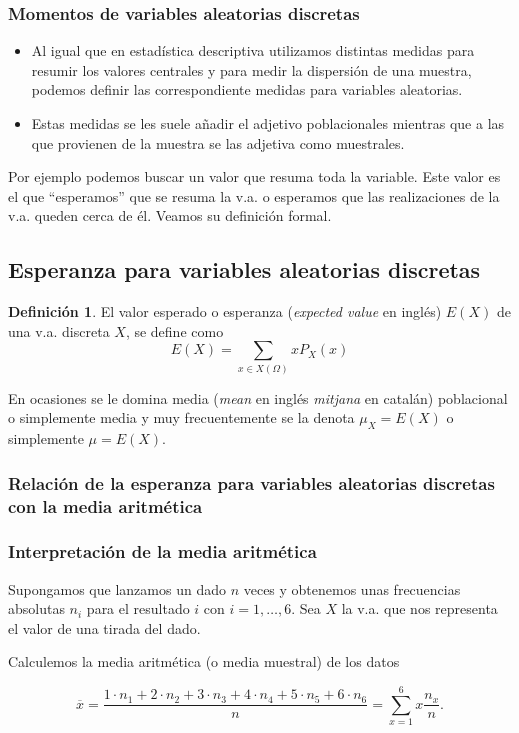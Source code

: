 \documentclass[handout]{beamer}\usepackage[]{graphicx}\usepackage[]{color}
\renewcommand{\emph}[1]{{\color{red}#1}}
\theoremstyle{plain}
\theoremstyle{definition}
\newtheorem{definicion}{Definición}
\begin{document}
\begin{frame}
\frametitle{Momentos de variables aleatorias discretas}

\begin{itemize}
\item Al igual que en  estadística descriptiva  utilizamos distintas medidas para
resumir los valores centrales y para medir la dispersión de una muestra, podemos definir
las correspondiente medidas para variables aleatorias.

\item Estas medidas se les suele añadir
el adjetivo poblacionales mientras que a las que provienen de la muestra se las adjetiva
como muestrales.
\end{itemize}

Por ejemplo  podemos buscar un valor que resuma toda la variable.
Este valor es el que ``\emph{esperamos}'' que se resuma la v.a. o esperamos que las
realizaciones de la v.a. queden cerca de él. Veamos su definición formal.

\end{frame}

\subsection{Esperanza para variables aleatorias discretas}

\begin{frame}


\begin{definicion}
    El valor \emph{esperado o esperanza} (\textsl{expected value} en inglés) $E(X)$ de una v.a. discreta $X$, se define como
    $$E(X)=\sum_{x\in X(\Omega)} x P_{X}(x)$$

    En ocasiones se le domina \emph{media} (\textsl{mean} en inglés \textsl{mitjana} en catalán) poblacional o simplemente media y muy frecuentemente se la denota
    $\mu_{X}=E(X)$ o simplemente $\mu=E(X)$.
    \end{definicion}
\end{frame}

\subsubsection{Relación de la esperanza para variables aleatorias
discretas con la media aritmética}


\begin{frame}
\frametitle{Interpretación de la media aritmética}

Supongamos que lanzamos un dado $n$ veces y obtenemos unas frecuencias absolutas $n_{i}$
para el resultado $i$ con $i=1,\ldots,6$. Sea $X$ la v.a. que nos representa el valor de
una tirada del dado.

Calculemos la media aritmética (o media muestral) de los datos

$$\overline{x}=\frac{1\cdot n_{1}+2\cdot  n_{2}+3\cdot  n_{3}+4\cdot  n_{4}+5\cdot  n_{5}+6 \cdot 
n_{6}}{n}=\sum_{x=1}^{6} x \frac{n_{x}}{n}.$$
\end{frame}
\end{document}
